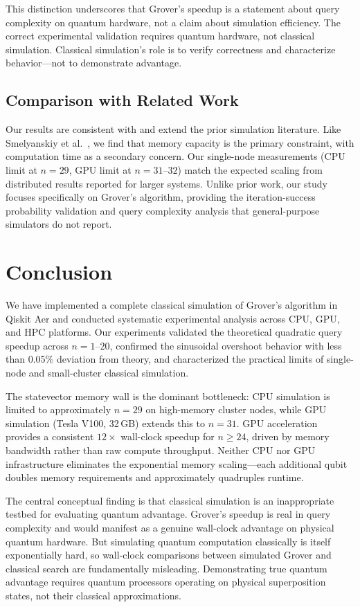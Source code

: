 \documentclass[sigconf, authorversion, nonacm]{acmart}
\begin{document}
This distinction underscores that Grover's speedup is a statement about query complexity on quantum hardware, not a claim about simulation efficiency. The correct experimental validation requires quantum hardware, not classical simulation. Classical simulation's role is to verify correctness and characterize behavior---not to demonstrate advantage.

\subsection{Comparison with Related Work}

Our results are consistent with and extend the prior simulation literature. Like Smelyanskiy et al.~\cite{Smelyanskiy2016}, we find that memory capacity is the primary constraint, with computation time as a secondary concern. Our single-node measurements (CPU limit at $n=29$, GPU limit at $n=31$--$32$) match the expected scaling from distributed results reported for larger systems. Unlike prior work, our study focuses specifically on Grover's algorithm, providing the iteration-success probability validation and query complexity analysis that general-purpose simulators do not report.

\section{Conclusion}

We have implemented a complete classical simulation of Grover's algorithm in Qiskit Aer and conducted systematic experimental analysis across CPU, GPU, and HPC platforms. Our experiments validated the theoretical quadratic query speedup across $n=1$--$20$, confirmed the sinusoidal overshoot behavior with less than 0.05\% deviation from theory, and characterized the practical limits of single-node and small-cluster classical simulation.

The statevector memory wall is the dominant bottleneck: CPU simulation is limited to approximately $n=29$ on high-memory cluster nodes, while GPU simulation (Tesla V100, 32\,GB) extends this to $n=31$. GPU acceleration provides a consistent $12\times$ wall-clock speedup for $n \geq 24$, driven by memory bandwidth rather than raw compute throughput. Neither CPU nor GPU infrastructure eliminates the exponential memory scaling---each additional qubit doubles memory requirements and approximately quadruples runtime.

The central conceptual finding is that classical simulation is an inappropriate testbed for evaluating quantum advantage. Grover's speedup is real in query complexity and would manifest as a genuine wall-clock advantage on physical quantum hardware. But simulating quantum computation classically is itself exponentially hard, so wall-clock comparisons between simulated Grover and classical search are fundamentally misleading. Demonstrating true quantum advantage requires quantum processors operating on physical superposition states, not their classical approximations.
\end{document}
